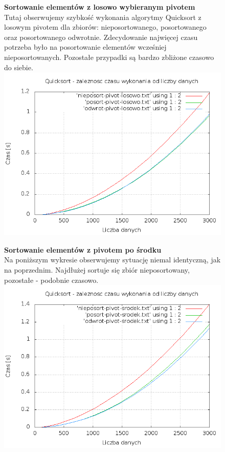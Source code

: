 \documentclass[a4paper,11pt]{report}
\begin{document}
\begin{figure}
  \begin{center}
  \textbf{Sortowanie elementów z losowo wybieranym pivotem}
  \\Tutaj obserwujemy szybkość wykonania algorytmy Quicksort z losowym pivotem dla zbiorów: nieposortowanego, posortowanego oraz posortowanego odwrotnie. Zdecydowanie najwięcej czasu potrzeba było na posortowanie elementów wcześniej nieposortowanych. Pozostałe przypadki są bardzo zbliżone czasowo do siebie.
  \\
  \includegraphics[scale=0.5]{./pivot-losowo.png}
    \label{fig:}
  \end{center}
\end{figure}

\begin{figure}
  \begin{center}
  \textbf{Sortowanie elementów z pivotem po środku}
  \\Na poniższym wykresie obserwujemy sytuację niemal identyczną, jak na poprzednim. Najdłużej sortuje się zbiór nieposortowany, pozostałe - podobnie czasowo.
  \\
  \includegraphics[scale=0.5]{./pivot-srodek.png}
    \label{fig:}
  \end{center}
\end{figure}
\end{document}
